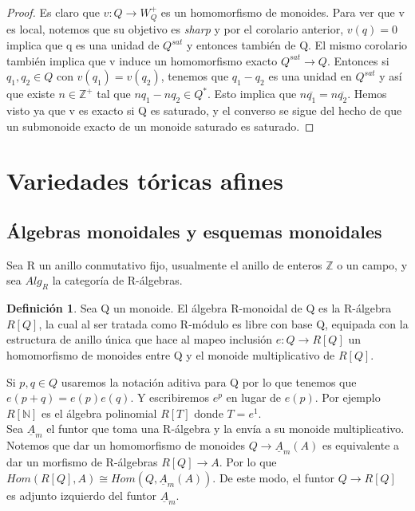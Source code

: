 \documentclass[12pt,spanish]{amsart}
\newcommand{\bb}[1]{\mathbb{#1}}
\theoremstyle{definition}
\newtheorem{Def}[Theorem]{Definición}
\theoremstyle{remark}
\begin{document}
\begin{proof}
Es claro que $v:Q \to W_{Q}^{+}$ es un homomorfismo de monoides. Para ver que v es local, notemos que su objetivo es \textit{sharp} y por el corolario anterior, $v(q)=0$ implica que q es una unidad de $Q^{sat}$ y entonces también de Q. El mismo corolario también implica que v induce un homomorfismo exacto $Q^{sat} \to Q$. Entonces si $q_{1},q_{2}\in Q$ con $v(q_{1})=v(q_{2})$, tenemos que $q_{1}-q_{2}$ es una unidad en $Q^{sat}$ y así que existe $n\in \bb{Z}^{+}$ tal que $nq_{1}-nq_{2}\in Q^{\ast}$. Esto implica que $n\overline{q_{1}}=n\overline{q_{2}}$. Hemos visto ya que v es exacto si Q es saturado, y el converso se sigue del hecho de que un submonoide exacto de un monoide saturado es saturado.     
\end{proof}

\section{Variedades tóricas afines}

\subsection{Álgebras monoidales y esquemas monoidales} 

Sea R un anillo conmutativo fijo, usualmente el anillo de enteros $\bb{Z}$ o un campo, y sea $Alg_{R}$ la categoría de R-álgebras. 
\begin{Def}
Sea Q un monoide. El álgebra R-monoidal de Q es la R-álgebra $R[Q]$, la cual al ser tratada como R-módulo es libre con base Q, equipada con la estructura de anillo única que hace al mapeo inclusión $e:Q \to R[Q]$ un homomorfismo de monoides entre Q y el monoide multiplicativo de $R[Q]$. 
\end{Def}

Si $p,q\in Q$ usaremos la notación aditiva para Q por lo que tenemos que $e(p+q)=e(p)e(q)$. Y escribiremos $e^{p}$ en lugar de $e(p)$. Por ejemplo $R[\bb{N}]$ es el álgebra polinomial $R[T]$ donde $T=e^{1}$. \\

Sea $\underline{A}_{m}$ el funtor que toma una R-álgebra y la envía a su monoide multiplicativo. Notemos que dar un homomorfismo de monoides $Q \to \underline{A}_{m}(A)$ es equivalente a dar un morfismo de R-álgebras $R[Q] \to A$. Por lo que $Hom(R[Q],A) \cong Hom(Q,\underline{A}_{m}(A))$. De este modo, el funtor $Q \to R[Q]$ es adjunto izquierdo del funtor $\underline{A}_{m}$.  
\end{document}
